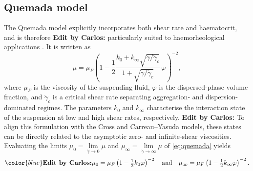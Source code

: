 \documentclass[lineno]{jfm}
\newcommand{\cbp}[1]{{\color{blue} \textbf{Edit by Carlos:} #1}}
\begin{document}
\subsection{Quemada model}

The Quemada model explicitly incorporates both shear rate and haematocrit, and is therefore \cbp{particularly suited to} haemorheological applications \citep{Quemada1977,Popel2005}. It is written as
\begin{equation}
\mu=\mu_{F}\left(1-\frac{1}{2}\frac{k_{0}+k_{\infty}\sqrt{\dot{\gamma}/\dot{\gamma}_{c}}}{1+\sqrt{\dot{\gamma}/\dot{\gamma}_{c}}}\,\varphi\right)^{-2},\label{eq:quemada}
\end{equation}
where $\mu_{F}$ is the viscosity of the suspending fluid, $\varphi$ is the dispersed-phase volume fraction, and $\dot{\gamma}_{c}$ is a critical shear rate separating aggregation- and dispersion-dominated regimes. The parameters $k_0$ and $k_{\infty}$ characterise the interaction state of the suspension at low and high shear rates, respectively.\cbp{ To align this formulation with the Cross and Carreau--Yasuda models, these states can be directly related to the asymptotic zero- and infinite-shear viscosities. Evaluating the limits $\mu_0 = \lim\limits_{\dot{\gamma} \to 0} \mu$ and $\mu_\infty = \lim\limits_{\dot{\gamma} \to \infty} \mu$ of \eqref{eq:quemada} yields}
\begin{equation}
\cbp{\mu_0 = \mu_F \left( 1 - \tfrac{1}{2} k_0 \varphi \right)^{-2} \quad \text{and} \quad \mu_\infty = \mu_F \left( 1 - \tfrac{1}{2} k_\infty \varphi \right)^{-2}.}\label{eq:quemada_limits}
\end{equation}
\end{document}
